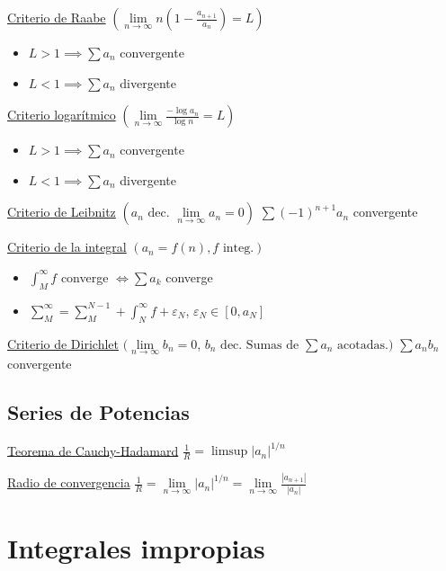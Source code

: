 \documentclass[12pt]{article}
\newcommand{\abs}[1]{\left\vert #1 \right\vert}
\begin{document}
\begin{multicols}{3}
    \underline{Criterio de Raabe}
    $\left( \lim\limits_{n \to \infty} n \left(1 - \frac{a_{n+1}}{a_n}\right)= L \right)$
    \begin{itemize}
        \item $L > 1 \implies \sum a_n$ convergente
        \item $L < 1 \implies \sum a_n$ divergente
    \end{itemize}
    
    \underline{Criterio logarítmico}
    $\left( \lim\limits_{n \to \infty} \frac{-\log{a_n}}{\log{n}} = L \right)$
    \begin{itemize}
        \item $L > 1 \implies \sum a_n$ convergente
        \item $L < 1 \implies \sum a_n$ divergente
    \end{itemize}
    
    \underline{Criterio de Leibnitz} $\left( a_n \text{ dec. } \lim\limits_{n \to \infty}
    a_n = 0 \right)$
    $\sum (-1)^{n+1} a_n$ convergente
    
    \underline{Criterio de la integral} $\left( a_n = f(n), f \text{ integ.} \right)$
    \begin{itemize}
        \item $\int_{M}^{\infty} f$ converge $\iff \sum a_k$ converge
        \item $\sum\limits_{M}^{\infty} = \sum\limits_{M}^{N-1} + \int_{N}^{\infty} f
        + \varepsilon_N$, $\varepsilon_N \in [0,a_N]$
    \end{itemize}
    
    \underline{Criterio de Dirichlet} $(\lim\limits_{n\to \infty} b_n = 0$, $b_n \text{ dec. Sumas de } \sum a_n
    \text{ acotadas.})$
    $\sum a_nb_n$ convergente
    
    \subsection{Series de Potencias}
    
    \underline{Teorema de Cauchy-Hadamard}
    $\frac{1}{R} = \limsup \abs{a_n}^{1/n}$
    
    \underline{Radio de convergencia}
    $\frac{1}{R} = \lim\limits_{n \to \infty} \abs{a_n}^{1/n} = 
    \lim\limits_{n \to \infty} \frac{\abs{a_{n+1}}}{\abs{a_n}}$
    
    \section{Integrales impropias}
    

\end{multicols}
\end{document}
